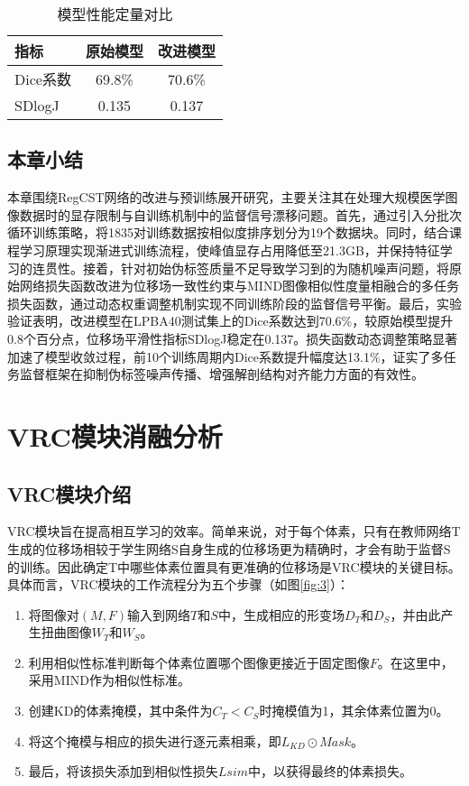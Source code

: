 \begin{table}[h]
    \centering
    \caption{模型性能定量对比}
    \label{tab:CSTresult}
    \begin{tabular}{lcc}
        \toprule
        \textbf{指标} & \textbf{原始模型} & \textbf{改进模型} \\
        \midrule
        Dice系数      & 69.8\%        & 70.6\%        \\
        SDlogJ      & 0.135         & 0.137         \\
        \bottomrule
    \end{tabular}
\end{table}

\section{本章小结}

本章围绕RegCST网络的改进与预训练展开研究，主要关注其在处理大规模医学图像数据时的显存限制与自训练机制中的监督信号漂移问题。首先，通过引入分批次循环训练策略，将1835对训练数据按相似度排序划分为19个数据块。同时，结合课程学习原理实现渐进式训练流程，使峰值显存占用降低至21.3GB，并保持特征学习的连贯性。接着，针对初始伪标签质量不足导致学习到的为随机噪声问题，将原始网络损失函数改进为位移场一致性约束与MIND图像相似性度量相融合的多任务损失函数，通过动态权重调整机制实现不同训练阶段的监督信号平衡。最后，实验验证表明，改进模型在LPBA40测试集上的Dice系数达到70.6\%，较原始模型提升0.8个百分点，位移场平滑性指标SDlogJ稳定在0.137。损失函数动态调整策略显著加速了模型收敛过程，前10个训练周期内Dice系数提升幅度达13.1\%，证实了多任务监督框架在抑制伪标签噪声传播、增强解剖结构对齐能力方面的有效性。



\chapter{VRC模块消融分析}

\section{VRC模块介绍}

VRC模块旨在提高相互学习的效率。简单来说，对于每个体素，只有在教师网络T生成的位移场相较于学生网络S自身生成的位移场更为精确时，才会有助于监督S的训练。因此确定T中哪些体素位置具有更准确的位移场是VRC模块的关键目标。具体而言，VRC模块的工作流程分为五个步骤（如图\ref{fig:3}）：

\begin{enumerate}
    \item 将图像对$(M,F)$输入到网络$T$和$S$中，生成相应的形变场$D_T$和$D_S$，并由此产生扭曲图像$W_T$和$W_S$。
    \item 利用相似性标准判断每个体素位置哪个图像更接近于固定图像$F$。在这里中，采用MIND作为相似性标准。
    \item 创建KD的体素掩模，其中条件为$C_T<C_S$时掩模值为1，其余体素位置为0。
    \item 将这个掩模与相应的损失进行逐元素相乘，即$L_{KD} \odot Mask$。
    \item 最后，将该损失添加到相似性损失$L{sim}$中，以获得最终的体素损失。
\end{enumerate}

